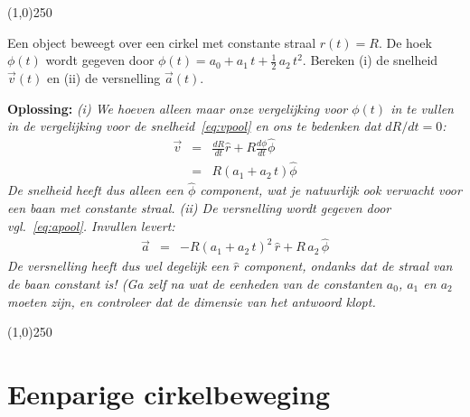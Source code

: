 \begin{center}
\line(1,0){250}
\end{center}
\begin{voorbeeld} 
Een object beweegt over een cirkel met constante straal $r(t)=R$. De hoek $\phi(t)$ wordt gegeven door
$\phi(t) = a_0 +a_1\,t +\frac{1}{2} \, a_2\,t^2$. Bereken (i) de snelheid $\vec{v}(t)$ en (ii) de versnelling $\vec{a}(t)$.

{\bf Oplossing: }{\it (i) We hoeven alleen maar onze vergelijking voor $\phi(t)$ in te vullen in de
vergelijking voor de snelheid~\ref{eq:vpool} en ons te bedenken dat $dR/dt=0$:
\begin{eqnarray}
\vec{v} & = & \frac{dR}{dt}\hat{r} + R\frac{d\phi}{dt}\hat{\phi} \\
& = & R\left(a_1 + a_2\,t\right)\hat{\phi}
\end{eqnarray}
De snelheid heeft dus alleen een $\hat{\phi}$ component, wat je natuurlijk ook verwacht voor een baan
met constante straal. (ii) De versnelling wordt gegeven door vgl.~\ref{eq:apool}. Invullen levert:
\begin{eqnarray}
\vec{a} & = & -R\left(a_1+a_2\,t\right)^2\,\hat{r} + R\,a_2\,\hat{\phi}
\end{eqnarray}
De versnelling heeft dus wel degelijk een $\hat{r}$ component, ondanks dat de straal van de baan constant 
is! (Ga zelf na wat de eenheden van de constanten $a_0$, $a_1$ en $a_2$ moeten zijn, en controleer dat de
dimensie van het antwoord klopt.
}
\end{voorbeeld}
\begin{center}
\line(1,0){250}
\end{center}
 

\section{Eenparige cirkelbeweging}

